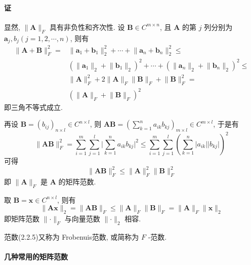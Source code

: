 \paragraph*{证} 显然, $\lVert \bm{A} \rVert _F$ 具有非负性和齐次性. 设 $\bm{B} \in C^{m\times n}$, 且 $\bm{A}$ 的第 $j$ 列分别为 $\bm{a}_j, b_{j}(j=
    1,2,\cdots,n)$, 则有
\begin{align*}
    \lVert \bm{A} + \bm{B} \rVert ^2_F = & \lVert \bm{a}_1 + \bm{b}_1 \rVert _2^2 + \cdots + \lVert \bm{a}_n + \bm{b}_n \rVert _2^2 \leqslant                                       \\
                                         & (\lVert \bm{a}_1 \rVert _2 + \lVert \bm{b}_1 \rVert _2)^2 + \cdots + (\lVert \bm{a}_n \rVert _2 + \lVert \bm{b}_n \rVert _2)^2 \leqslant \\
                                         & \lVert \bm{A} \rVert _F^2 + 2\lVert \bm{A} \rVert _F \lVert \bm{B} \rVert _F + \lVert \bm{B} \rVert _F^2 =                               \\
                                         & (\lVert \bm{A} \rVert _F + \lVert \bm{B} \rVert _F)^2
\end{align*}
即三角不等式成立.
\par 再设 $\bm{B} = (b_{ij})_{n\times l} \in C^{n\times l}$, 则 $\bm{AB} = (\sum\limits_{k=1}^{n}a_{ik}b_{kj})_{m\times l} \in C^{m\times l}$, 于是有
$$
    \lVert \bm{AB} \rVert _F^2 = \sum\limits_{i=1}^m\sum\limits_{j=1}^l \lvert \sum\limits_{k=1}^na_{ik}b_{kj} \rvert^2 \leqslant \sum\limits_{i=1}^m\sum\limits_{j=1}^l (\sum\limits_{k=1}^n \lvert a_{ik}\rvert \lvert b_{kj} \rvert)^2
$$
可得
$$
    \lVert \bm{AB} \rVert _F^2 \leqslant \lVert \bm{A} \rVert _F^2 \lVert \bm{B} \rVert _F^2
$$
即 $\lVert \bm{A} \rVert _F$ 是 $\bm{A}$ 的矩阵范数.

\par 取 $\bm{B} = \bm{x} \in C^{n\times l}$, 则有
$$
    \lVert \bm{Ax} \rVert _2 = \lVert \bm{AB} \rVert _F \leqslant \lVert \bm{A} \rVert _F \lVert \bm{B} \rVert _F = \lVert \bm{A} \rVert _F \lVert \bm{x} \rVert _2
$$
即矩阵范数 $\lVert \bm{\cdot} \rVert _F$ 与向量范数 $\lVert \bm{\cdot} \rVert _2$ 相容.

\par 范数(2.2.5)又称为 Frobenuis范数, 或简称为 $F$ -范数.

\paragraph[]{几种常用的矩阵范数} \

